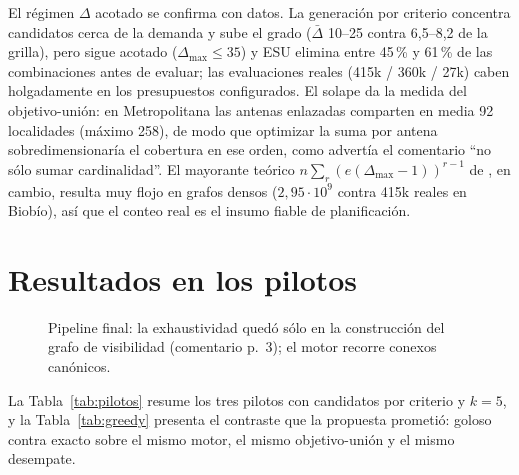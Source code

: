 \documentclass[12pt,letterpaper]{article}
\begin{document}
El régimen $\Delta$ acotado se confirma con datos. La generación por criterio concentra candidatos cerca de la demanda y sube el grado ($\bar\Delta$ 10--25 contra 6,5--8,2 de la grilla), pero sigue acotado ($\Delta_{\max} \le 35$) y ESU elimina entre 45\,\% y 61\,\% de las combinaciones antes de evaluar; las evaluaciones reales (415k / 360k / 27k) caben holgadamente en los presupuestos configurados. El solape da la medida del objetivo-unión: en Metropolitana las antenas enlazadas comparten en media 92 localidades (máximo 258), de modo que optimizar la suma por antena sobredimensionaría el cobertura en ese orden, como advertía el comentario ``no sólo sumar cardinalidad''. El mayorante teórico $n\sum_{r}(e(\Delta_{\max}-1))^{r-1}$ de \cite{wernicke2006}, en cambio, resulta muy flojo en grafos densos ($2{,}95 \cdot 10^9$ contra 415k reales en Biobío), así que el conteo real es el insumo fiable de planificación.

\section{Resultados en los pilotos}
\label{sec:resultados}

\begin{figure}[H]
\centering
{}
\caption{Pipeline final: la exhaustividad quedó sólo en la construcción del grafo de visibilidad (comentario p.~3); el motor recorre conexos canónicos.}
\label{fig:flujo}
\end{figure}

La Tabla~\ref{tab:pilotos} resume los tres pilotos con candidatos por criterio y $k = 5$, y la Tabla~\ref{tab:greedy} presenta el contraste que la propuesta prometió: goloso contra exacto sobre el mismo motor, el mismo objetivo-unión y el mismo desempate.
\end{document}
